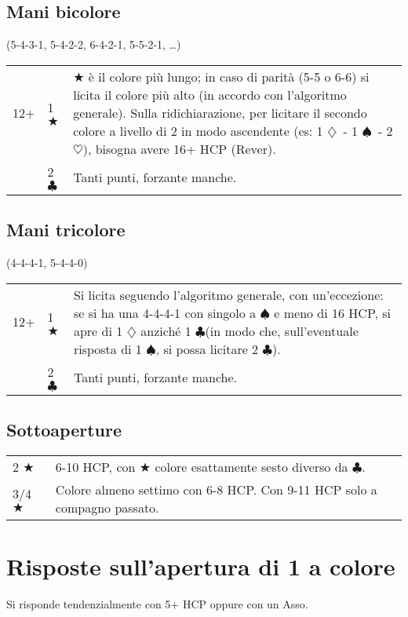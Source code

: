\documentclass[a4paper,10pt]{article}
\renewcommand{\c}{$\clubsuit$\xspace}
\renewcommand{\d}{$\diamondsuit$\xspace}
\newcommand{\h}{$\heartsuit$\xspace}
\newcommand{\s}{$\spadesuit$\xspace}
\renewcommand{\j}{$\bigstar$\xspace}
\newcommand{\smallspace}{\vskip0.3cm}
\newenvironment{twocol}
  {\smallspace\noindent\begin{tabular}{l p{0.78\textwidth}}}
  {\end{tabular}\smallspace}
\newenvironment{threecol}
  {\smallspace\noindent\begin{tabular}{l l p{0.78\textwidth}}}
  {\end{tabular}\smallspace}
\begin{document}
\subsection{Mani bicolore}
(5-4-3-1, 5-4-2-2, 6-4-2-1, 5-5-2-1, \dots)

\begin{threecol}
 12+ & 1 \j & \j è il colore più lungo; in caso di parità (5-5 o 6-6) si licita il colore più alto (in accordo con l'algoritmo generale). Sulla ridichiarazione, per licitare il secondo colore a livello di 2 in modo ascendente (es: 1 \d\ - 1 \s\ - 2 \h), bisogna avere 16+ HCP (Rever).\\
 & 2 \c & Tanti punti, forzante manche.
\end{threecol}


\subsection{Mani tricolore}
(4-4-4-1, 5-4-4-0)

\begin{threecol}
 12+ & 1 \j & Si licita seguendo l'algoritmo generale, con un'eccezione: se si ha una 4-4-4-1 con singolo a \s e meno di 16 HCP, si apre di 1 \d anziché 1 \c (in modo che, sull'eventuale risposta di 1 \s, si possa licitare 2 \c).\\
 & 2 \c & Tanti punti, forzante manche.
\end{threecol}


\subsection{Sottoaperture}

\begin{twocol}
 2 \j & 6-10 HCP, con \j colore esattamente sesto diverso da \c.\\
 3/4 \j & Colore almeno settimo con 6-8 HCP. Con 9-11 HCP solo a compagno passato.\\
\end{twocol}



\pagebreak

\section{Risposte sull'apertura di 1 a colore}

Si risponde tendenzialmente con 5+ HCP oppure con un Asso.
\end{document}
